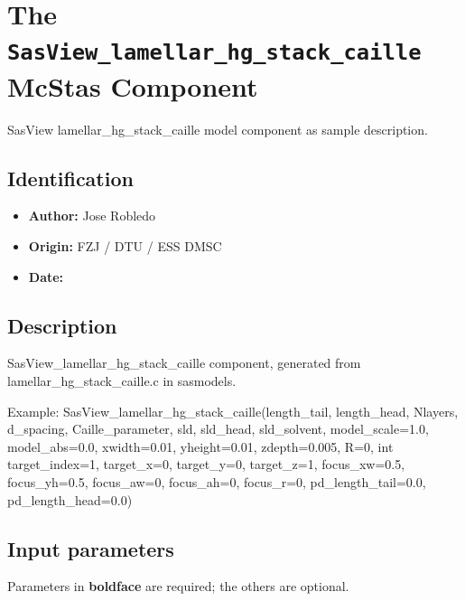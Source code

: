 \section{The \texttt{SasView\_lamellar\_hg\_stack\_caille} McStas Component}
SasView lamellar\_hg\_stack\_caille model component as sample description.

\subsection*{Identification}
\begin{itemize}
  \item \textbf{Author:} Jose Robledo
  \item \textbf{Origin:} FZJ / DTU / ESS DMSC
  \item \textbf{Date:} 
\end{itemize}

\subsection*{Description}
SasView\_lamellar\_hg\_stack\_caille component, generated from lamellar\_hg\_stack\_caille.c in sasmodels.

Example: SasView\_lamellar\_hg\_stack\_caille(length\_tail, length\_head, Nlayers, d\_spacing, Caille\_parameter, sld, sld\_head, sld\_solvent, model\_scale=1.0, model\_abs=0.0, xwidth=0.01, yheight=0.01, zdepth=0.005, R=0, int target\_index=1, target\_x=0, target\_y=0, target\_z=1, focus\_xw=0.5, focus\_yh=0.5, focus\_aw=0, focus\_ah=0, focus\_r=0, pd\_length\_tail=0.0, pd\_length\_head=0.0)

\subsection*{Input parameters}
Parameters in \textbf{boldface} are required; the others are optional.

